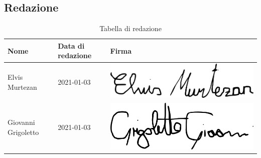 \subsection{Redazione}
{
	\renewcommand{\arraystretch}{2}
	\begin{longtable}{ C{5cm} C{4cm} C{5cm} }
		\caption{Tabella di redazione}\\
		\rowcolor{\primaryColor}
        \textcolor{\secondaryColor}{\textbf{Nome}} & \textcolor{\secondaryColor}{\textbf{Data di redazione}} & \textcolor{\secondaryColor}{\textbf{Firma}}\\ \endhead        		
		{Elvis Murtezan} & 2021-01-03 & \includegraphics[scale=0.20]{./src/Organigramma/immagini/firme/Elvis.png}\\
		{Giovanni Grigoletto} & 2021-01-03 & \includegraphics[scale=0.20]{./src/Organigramma/immagini/firme/giovanni.png}\\
	\end{longtable}
}


